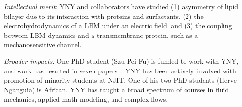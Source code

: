\documentclass[11pt]{article}
\begin{document}
\noindent
{\it Intellectual merit:} YNY and collaborators have studied (1)
asymmetry of lipid bilayer due to its interaction with proteins and
surfactants, (2) the electrohydrodynamics of a LBM under an electric
field, and (3) the coupling between LBM dynamics and a transmembrane
protein, such as a mechanosensitive channel. 

\noindent
{\it Broader impacts:} 
One PhD student (Szu-Pei Fu) is funded to work with YNY, and work has
resulted in seven papers~\cite{Nganguia2013_PoF, Nganguia2013_PRE,
Young2014_JFM, Young2015_PoF, Nganguia2015_CiCP, Pak2015, Fu2015_PRE}.
YNY has been actively involved with promotion of minority students at
NJIT.  One of his two PhD students (Herve Nganguia) is African. YNY has
taught a broad spectrum of courses in fluid mechanics, applied math
modeling, and complex flows.


\newpage

%



\end{document}
